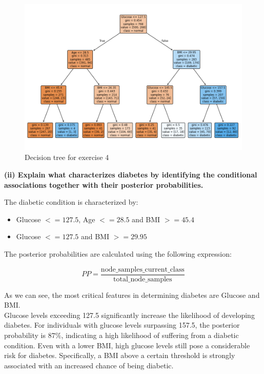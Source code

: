 \documentclass[12pt]{article}
\begin{document}
\begin{enumerate}[leftmargin=\labelsep,resume]
    \begin{figure}[H]
        \centering
          \includegraphics[width=15cm]{./Part II/4.png}
          \caption{Decision tree for exercise 4}
    \end{figure}

\vspace{2cm}

\textbf{(ii) Explain what characterizes diabetes by identifying the conditional associations
together with their posterior probabilities.}

The diabetic condition is characterized by:

\begin{itemize}
    \item Glucose $<= 127.5$, Age $<= 28.5$ and BMI $>= 45.4$
    \item Glucose $<= 127.5$ and BMI $>= 29.95$
\end{itemize}

The posterior probabilities are calculated using the following expression:

\[
PP = \frac{\text{node\_samples\_current\_class}}{\text{total\_node\_samples}}
\]

As we can see, the most critical features in determining diabetes are Glucose and BMI.\\ 
Glucose levels exceeding 127.5 significantly increase the likelihood of developing diabetes. For individuals with glucose levels surpassing 157.5, the posterior probability is $87\%$, indicating a high likelihood of suffering from a diabetic condition. 
Even with a lower BMI, high glucose levels still pose a considerable risk for diabetes. Specifically, a BMI above a certain threshold is strongly associated with an increased chance of being diabetic.


\end{enumerate}
\end{document}
